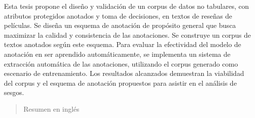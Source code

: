 \begin{resumen}
	Esta tesis propone el dise\~no y validaci\'on de un corpus de datos no tabulares, con atributos protegidos anotados y toma de 
	decisiones, en textos de rese\~nas de pel\'iculas. Se dise\~na un esquema de anotaci\'on de prop\'osito general que busca maximizar 
	la calidad y consistencia de las anotaciones. Se construye un corpus de textos anotados seg\'un este esquema. Para evaluar la 
	efectividad del modelo de anotaci\'on en ser aprendido autom\'aticamente, se implementa un sistema de extracci\'on autom\'atica de 
	las anotaciones, utilizando el corpus generado como escenario de entrenamiento. Los resultados alcanzados demuestran la viabilidad 
	del corpus y el esquema de anotaci\'on propuestos para asistir en el an\'alisis de sesgos.



\end{resumen}

\begin{abstract}
	Resumen en inglés
\end{abstract}